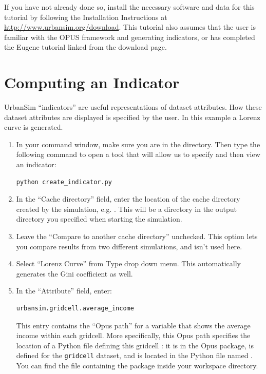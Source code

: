 \documentclass{howto}
\begin{document}
If you have not already done so, install the necessary software and data
for this tutorial by following the Installation Instructions at
\url{http://www.urbansim.org/download}.  This tutorial also assumes that
the user is familiar with the OPUS framework and generating indicators, or
has completed the Eugene tutorial linked from the download page.

\section{Computing an Indicator}

UrbanSim ``indicators'' are useful representations of dataset attributes.  
How these dataset attributes are displayed is specified by the user.  
In this example a Lorenz curve is generated.

\begin{enumerate}

\item In your command window, make sure you are in the
 directory.  Then type the following command to
open a tool that will allow us to specify and then view an
indicator:

\begin{verbatim}
python create_indicator.py
\end{verbatim}

\item In the ``Cache directory'' field, enter the location of the cache directory
created by the
simulation, e.g. .
This will be a directory in the output directory you specified when
starting the simulation.

\item Leave the ``Compare to another cache directory'' unchecked.  This
option lets you compare results from two different simulations, and isn't
used here.

\item Select ``Lorenz Curve'' from Type drop down menu. This automatically
generates the Gini coefficient as well.

\item In the ``Attribute'' field, enter:

\begin{verbatim}
urbansim.gridcell.average_income
\end{verbatim}

This entry contains the ``Opus path'' for a variable that shows the
average income within each gridcell.  More specifically, this Opus path specifies
the location of a Python file defining this gridcell : it is
in the  Opus package, is defined for the
\verb|gridcell| dataset, and is located in the Python file named
. You can find the file containing the 
package inside your workspace directory.


\end{enumerate}
\end{document}
